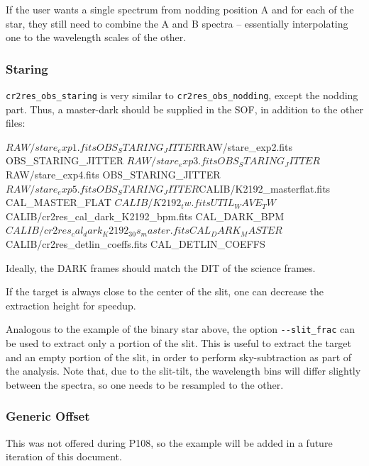 If the user wants a single spectrum from nodding position A and for each of the
star, they still need to combine the A and B spectra -- essentially interpolating
one to the wavelength scales of the other.


\subsubsection{Staring}

\verb!cr2res_obs_staring! is very similar to \verb!cr2res_obs_nodding!, except
the nodding part. Thus, a master-dark should be supplied in the SOF, in addition
to the other files:
\begin{shell}[fontsize=\small]
$RAW/stare_exp1.fits        OBS_STARING_JITTER
$RAW/stare_exp2.fits        OBS_STARING_JITTER
$RAW/stare_exp3.fits        OBS_STARING_JITTER
$RAW/stare_exp4.fits        OBS_STARING_JITTER
$RAW/stare_exp5.fits        OBS_STARING_JITTER
$CALIB/K2192_masterflat.fits                  CAL_MASTER_FLAT
$CALIB/K2192_tw.fits                          UTIL_WAVE_TW
$CALIB/cr2res_cal_dark_K2192_bpm.fits         CAL_DARK_BPM
$CALIB/cr2res_cal_dark_K2192_30s_master.fits  CAL_DARK_MASTER
$CALIB/cr2res_detlin_coeffs.fits              CAL_DETLIN_COEFFS
\end{shell}  
Ideally, the DARK frames should match the DIT of the science frames.

If the target is always close to the center of the slit, one can decrease the extraction height for speedup.
\begin{shell}[fontsize=\small]
\end{shell}  

Analogous to the example of the binary star above, the option \verb!--slit_frac!
can be used to extract only a portion of the slit. This is useful to extract the
target and an empty portion of the slit, in order to perform sky-subtraction as
part of the analysis. Note that, due to the slit-tilt, the wavelength bins will
differ slightly between the spectra, so one needs to be resampled to the other.

\subsubsection{Generic Offset}

This was not offered during P108, so the example will be added in a
future iteration of this document.

